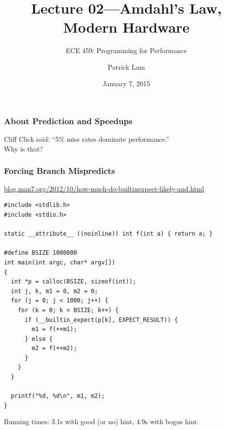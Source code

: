 \documentclass[aspectratio=43]{beamer}
\title{Lecture 02---Amdahl's Law, Modern Hardware}
\subtitle{ECE 459: Programming for Performance}
\author{Patrick Lam}
\institute{University of Waterloo}
\date{January 7, 2015}
\begin{document}
\begin{frame}[plain]
  \titlepage
\end{frame}

\begin{frame}
  \frametitle{About Prediction and Speedups}

\begin{center}
Cliff Click said: ``5\% miss rates dominate performance.'' \\[2em]

Why is that?\\[2em]
\end{center}
\end{frame}

\begin{frame}[fragile]
  \frametitle{Forcing Branch Mispredicts}

\begin{center}
\url{blog.man7.org/2012/10/how-much-do-builtinexpect-likely-and.html}
\end{center}

{\tiny
\begin{verbatim}
#include <stdlib.h>
#include <stdio.h>

static __attribute__ ((noinline)) int f(int a) { return a; }

#define BSIZE 1000000
int main(int argc, char* argv[]) 
{
  int *p = calloc(BSIZE, sizeof(int));
  int j, k, m1 = 0, m2 = 0;
  for (j = 0; j < 1000; j++) {
    for (k = 0; k < BSIZE; k++) {
      if (__builtin_expect(p[k], EXPECT_RESULT)) {
        m1 = f(++m1);
      } else {
        m2 = f(++m2);
      }
    }
  }

  printf("%d, %d\n", m1, m2);
}
\end{verbatim}
}
Running times: 3.1s with good (or no) hint, 4.9s with bogus hint.
\end{frame}
\end{document}
